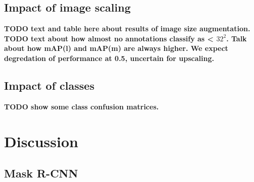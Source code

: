 \documentclass[oneside, english, bibtex]{kththesis}
\begin{document}
\begin{table}[H]
  \begin{center}
    \caption{Gradually increasing dataset size - 1 class - Out-set}
    \label{tab:dsizeonecoutset}
  \end{center}
\end{table}

\clearpage

\section{Impact of image scaling}

\textbf{TODO text and table here about results of image size augmentation. TODO text about how almost no annotations classify as < $32^2$. Talk about how mAP(l) and mAP(m) are always higher. We expect degredation of performance at 0.5, uncertain for upscaling.}


\section{Impact of classes}

\textbf{TODO show some class confusion matrices.}

\chapter{Discussion}
\label{ch:disc}


\section{Mask R-CNN}
\end{document}
